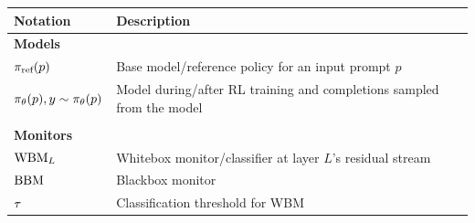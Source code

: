 \begin{table}[!h]
\centering
\begin{tabular}{ll}
\toprule
\textbf{Notation} & \textbf{Description} \\
\midrule
\multicolumn{2}{l}{\textbf{Models}} \\
$\pi_{\text{ref}}(p)$ & Base model/reference policy for an input prompt $p$ \\%
$\pi_{\theta}(p), y \sim \pi_{\theta}(p)$ & Model during/after RL training and completions sampled from the model \\%
\\[-7pt]
\multicolumn{2}{l}{\textbf{Monitors}} \\
$\text{WBM}_{L}$ & Whitebox monitor/classifier at layer $L$'s residual stream \\%
$\text{BBM}$ & Blackbox monitor \\ %
$\tau$ & Classification threshold for WBM \\%

\end{tabular}
\end{table}
